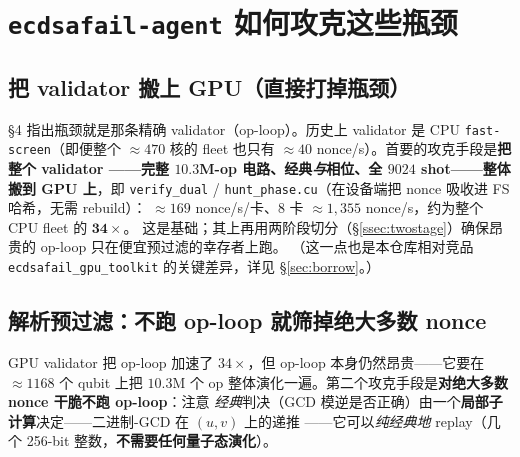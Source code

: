\documentclass[11pt]{ctexart}
\let\c\lstinline
\begin{document}
\section{\texttt{ecdsafail-agent} 如何攻克这些瓶颈}

\subsection{把 validator 搬上 GPU（直接打掉瓶颈）}
\label{ssec:gpuval}
§4 指出瓶颈就是那条精确 validator（op-loop）。历史上 validator 是 CPU \c{fast-screen}（即便整个
$\approx 470$ 核的 fleet 也只有 $\approx 40$ nonce/s）。首要的攻克手段是\textbf{把整个 validator
——完整 $10.3$M-op 电路、经典\emph{与}相位、全 $9024$ shot——整体搬到 GPU 上}，即
\c{verify_dual} / \c{hunt_phase.cu}（在设备端把 nonce 吸收进 FS 哈希，无需 rebuild）：
$\approx 169$ nonce/s/卡、8 卡 $\approx 1{,}355$ nonce/s，约为整个 CPU fleet 的 $\mathbf{34\times}$。
这是基础；其上再用两阶段切分（§\ref{ssec:twostage}）确保昂贵的 op-loop 只在便宜预过滤的幸存者上跑。
（这一点也是本仓库相对竞品 \texttt{ecdsafail\_gpu\_toolkit} 的关键差异，详见 §\ref{sec:borrow}。）

\subsection{解析预过滤：不跑 op-loop 就筛掉绝大多数 nonce}
\label{ssec:prefilter}
GPU validator 把 op-loop 加速了 $34\times$，但 op-loop 本身仍然昂贵——它要在 $\approx 1168$ 个 qubit
上把 $10.3$M 个 op 整体演化一遍。第二个攻克手段是\textbf{对绝大多数 nonce 干脆不跑 op-loop}：注意
\emph{经典}判决（GCD 模逆是否正确）由一个\textbf{局部子计算}决定——二进制-GCD 在 $(u,v)$ 上的递推
——它可以\emph{纯经典地} replay（几个 256-bit 整数，\textbf{不需要任何量子态演化}）。
\end{document}
